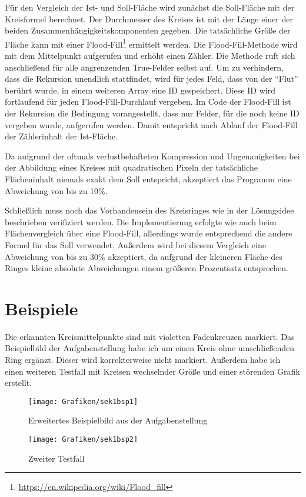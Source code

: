 Für den Vergleich der Ist- und Soll-Fläche wird zunächst die Soll-Fläche mit der Kreisformel berechnet. Der Durchmesser des Kreises ist mit der Länge einer der beiden Zusammenhängigkeitskomponenten gegeben. Die tatsächliche Größe der Fläche kann mit einer Flood-Fill\footnote{\url{https://en.wikipedia.org/wiki/Flood_fill}} ermittelt werden.
Die Flood-Fill-Methode wird mit dem Mittelpunkt aufgerufen und erhöht einen Zähler. Die Methode ruft sich anschließend für alle angrenzenden True-Felder selbst auf. Um zu verhindern, dass die Rekursion unendlich stattfindet, wird für jedes Feld, dass von der "`Flut"' berührt wurde, in einem weiteren Array eine ID gespeichert.
Diese ID wird fortlaufend für jeden Flood-Fill-Durchlauf vergeben. Im Code der Flood-Fill ist der Rekursion die Bedingung vorangestellt, dass nur Felder, für die noch keine ID vergeben wurde, aufgerufen werden. Damit entspricht nach Ablauf der Flood-Fill der Zählerinhalt der Ist-Fläche.

Da aufgrund der oftmals verlustbehafteten Kompression und Ungenauigkeiten bei der Abbildung eines Kreises mit quadratischen Pixeln der tatsächliche Flächeninhalt  niemals exakt dem Soll entspricht, akzeptiert das Programm eine Abweichung von bis zu 10\%. 

Schließlich muss noch das Vorhandensein des Kreisringes wie in der Lösungsidee beschrieben verifiziert werden. Die Implementierung erfolgte wie auch beim Flächenvergleich über eine Flood-Fill, allerdings wurde entsprechend die andere Formel für das Soll verwendet. Außerdem wird bei diesem Vergleich eine Abweichung von bis zu 30\% akzeptiert, da aufgrund der kleineren Fläche des Ringes kleine absolute Abweichungen einem größeren Prozentsatz entsprechen.

\pagebreak
\section{Beispiele}
Die erkannten Kreismittelpunkte sind mit violetten Fadenkreuzen markiert. Das Beispielbild der Aufgabenstellung habe ich um einen Kreis ohne umschließenden Ring ergänzt. Dieser wird korrekterweise nicht markiert. Außerdem habe ich einen weiteren Testfall mit Kreisen wechselnder Größe und einer störenden Grafik erstellt.
\begin{figure}[!ht]
	\centering	
	\texttt{[image: Grafiken/sek1bsp1]}
	\caption{Erweitertes Beispielbild aus der Aufgabenstellung}
\end{figure}
\vfill{}
\begin{figure}[!ht]
	\centering	
	\texttt{[image: Grafiken/sek1bsp2]}
	\caption{Zweiter Testfall}
\end{figure}
